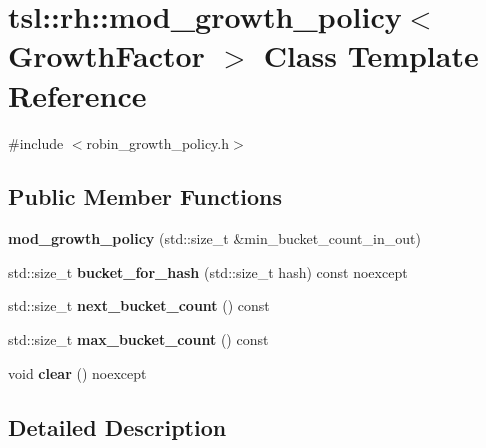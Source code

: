 \hypertarget{classtsl_1_1rh_1_1mod__growth__policy}{}\section{tsl\+::rh\+::mod\+\_\+growth\+\_\+policy$<$ Growth\+Factor $>$ Class Template Reference}
\label{classtsl_1_1rh_1_1mod__growth__policy}


{\ttfamily \#include $<$robin\+\_\+growth\+\_\+policy.\+h$>$}

\subsection*{Public Member Functions}
\begin{DoxyCompactItemize}
\item 
\mbox{\label{classtsl_1_1rh_1_1mod__growth__policy_ab4b91e3953a09ae9432bba3c7b35e3c2}} 
{\bfseries mod\+\_\+growth\+\_\+policy} (std\+::size\+\_\+t \&min\+\_\+bucket\+\_\+count\+\_\+in\+\_\+out)
\item 
\mbox{\label{classtsl_1_1rh_1_1mod__growth__policy_a9452d5121bb6838c282760ac0e84864a}} 
std\+::size\+\_\+t {\bfseries bucket\+\_\+for\+\_\+hash} (std\+::size\+\_\+t hash) const noexcept
\item 
\mbox{\label{classtsl_1_1rh_1_1mod__growth__policy_a4b19b624612cd19ecbfcba6ae38b9166}} 
std\+::size\+\_\+t {\bfseries next\+\_\+bucket\+\_\+count} () const
\item 
\mbox{\label{classtsl_1_1rh_1_1mod__growth__policy_a758984fba37f1fecc39a674d4471d309}} 
std\+::size\+\_\+t {\bfseries max\+\_\+bucket\+\_\+count} () const
\item 
\mbox{\label{classtsl_1_1rh_1_1mod__growth__policy_a8a5edf253f35ca5eb6a803cf15811ed9}} 
void {\bfseries clear} () noexcept
\end{DoxyCompactItemize}


\subsection{Detailed Description}
